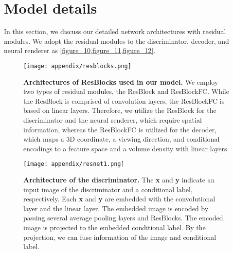 \documentclass[nohyperref]{article}
\theoremstyle{plain}
\theoremstyle{definition}
\theoremstyle{remark}
\begin{document}




\newpage
\appendix
\onecolumn
\section{Model details}
In this section, we discuss our detailed network architectures with residual modules. We adopt the residual modules to the discriminator, decoder, and neural renderer as \cref{figure_10,figure_11,figure_12}.


\begin{figure}[h]
\begin{center}
\centerline{\texttt{[image: appendix/resblocks.png]}}
\caption{\textbf{Architectures of ResBlocks used in our model.} We employ two types of residual modules, the ResBlock and ResBlockFC. While the ResBlock is comprised of convolution layers, the ResBlockFC is based on linear layers. Therefore, we utilize the ResBlock for the discriminator and the neural renderer, which require spatial information, whereas the ResBlockFC is utilized for the decoder, which maps a 3D coordinate, a viewing direction, and conditional encodings to a feature space and a volume density with linear layers.}
\label{figure_10}
\end{center}
\vskip -0.2in
\end{figure}




\begin{figure}[h]
\begin{center}
\centerline{\texttt{[image: appendix/resnet1.png]}}
\caption{\textbf{Architecture of the discriminator.} The \textbf{x} and \textbf{y} indicate an input image of the discriminator and a conditional label, respectively. Each \textbf{x} and \textbf{y} are embedded with the convolutional layer and the linear layer. The embedded image is encoded by passing several average pooling layers and ResBlocks. The encoded image is projected to the embedded conditional label. By the projection, we can fuse information of the image and conditional label.}
\label{figure_11}
\end{center}
\vskip -0.2in
\end{figure}
\end{document}
